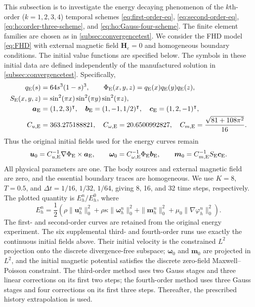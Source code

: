 \documentclass[11pt,a4paper]{article}
\newcommand{\bs}{\boldsymbol}
\newcommand{\dt}{\Delta t}
\theoremstyle{definition}
\numberwithin{equation}{section}
\begin{document}
This subsection is to investigate the energy decaying phenomenon of the $k$th-order ($k=1,2,3,4$) temporal schemes \eqref{eq:first-order-eq}, \eqref{eq:second-order-eq}, \eqref{eq:ho:order-three-scheme}, and \eqref{eq:ho:Gauss-four-scheme}. The finite element families are chosen as in \cref{subsec:convergencetest}. We consider the FHD model \eqref{eq:FHD} with external magnetic field $\bs H_{e} = 0$ and homogeneous boundary conditions. The initial value functions are specified below.
The symbols in these initial data are defined independently of the
manufactured solution in \cref{subsec:convergencetest}. Specifically,
\[
\begin{aligned}
 q_{\rm E}(s)&=64s^3(1-s)^3,\qquad
 \Phi_{\rm E}(x,y,z)=q_{\rm E}(x)q_{\rm E}(y)q_{\rm E}(z),\\
 S_{\rm E}(x,y,z)&=\sin^2(\pi x)\sin^2(\pi y)\sin^2(\pi z),\\
 \bs a_{\rm E}&=(1,2,3)^\intercal,\quad
 \bs b_{\rm E}=(1,-1,1/2)^\intercal,\quad
 \bs c_{\rm E}=(1,2,-1)^\intercal,\\
 C_{u,\rm E}&=363.275188821,\quad
 C_{\omega,\rm E}=20.6500992827,\quad
 C_{m,\rm E}=\frac{\sqrt{81+108\pi^2}}{16}.
\end{aligned}
\]
Thus the original initial fields used for the energy curves remain
\[
\bs u_0=C_{u,\rm E}^{-1}\nabla\Phi_{\rm E}\times\bs a_{\rm E},\qquad
\bs\omega_0=C_{\omega,\rm E}^{-1}\Phi_{\rm E}\bs b_{\rm E},\qquad
\bs m_0=C_{m,\rm E}^{-1}S_{\rm E}\bs c_{\rm E}.
\]
All physical parameters are one. The body sources and external magnetic
field are zero, and the essential boundary traces are homogeneous. We use
$K=8$, $T=0.5$, and $\dt=1/16,\,1/32,\,1/64$, giving 8, 16, and 32 time
steps, respectively. The plotted quantity is $E_h^n/E_h^0$, where
\[
 E_h^n=\frac12\left(\rho\|\bs u_h^n\|_0^2
 +\rho\kappa\|\bs\omega_h^n\|_0^2+\|\bs m_h^n\|_0^2
 +\mu_0\|\nabla\varphi_h^n\|_0^2\right).
\]
The first- and second-order curves are retained from the original energy
experiment. The six supplemental third- and fourth-order runs use exactly
the continuous initial fields above. Their initial velocity is the
constrained $L^2$ projection onto the discrete divergence-free subspace;
$\bs\omega_0$ and $\bs m_0$ are projected in $L^2$, and the initial magnetic
potential satisfies the discrete zero-field Maxwell--Poisson constraint.
The third-order method uses two Gauss stages and three linear corrections
on its first two steps; the fourth-order method uses three Gauss stages
and four corrections on its first three steps. Thereafter, the prescribed
history extrapolation is used.
\end{document}
